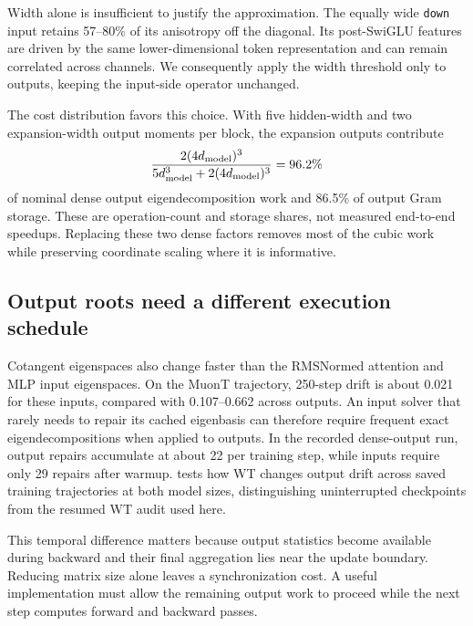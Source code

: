Width alone is insufficient to justify the approximation. The equally wide \texttt{down} input retains 57--80\% of its anisotropy off the diagonal. Its post-SwiGLU features are driven by the same lower-dimensional token representation and can remain correlated across channels. We consequently apply the width threshold only to outputs, keeping the input-side operator unchanged.

The cost distribution favors this choice. With five hidden-width and two expansion-width output moments per block, the expansion outputs contribute
\begin{equation}
 \frac{2(4d_{\mathrm{model}})^3}{5d_{\mathrm{model}}^3+2(4d_{\mathrm{model}})^3}=96.2\%
\end{equation}
of nominal dense output eigendecomposition work and 86.5\% of output Gram storage. These are operation-count and storage shares, not measured end-to-end speedups. Replacing these two dense factors removes most of the cubic work while preserving coordinate scaling where it is informative.

\subsection{Output roots need a different execution schedule}
\label{sec:drift_cost}

Cotangent eigenspaces also change faster than the RMSNormed attention and MLP input eigenspaces. On the MuonT trajectory, 250-step drift is about 0.021 for these inputs, compared with 0.107--0.662 across outputs. An input solver that rarely needs to repair its cached eigenbasis can therefore require frequent exact eigendecompositions when applied to outputs. In the recorded dense-output run, output repairs accumulate at about 22 per training step, while inputs require only 29 repairs after warmup.  tests how WT changes output drift across saved training trajectories at both model sizes, distinguishing uninterrupted checkpoints from the resumed WT audit used here.

This temporal difference matters because output statistics become available during backward and their final aggregation lies near the update boundary. Reducing matrix size alone leaves a synchronization cost. A useful implementation must allow the remaining output work to proceed while the next step computes forward and backward passes.
